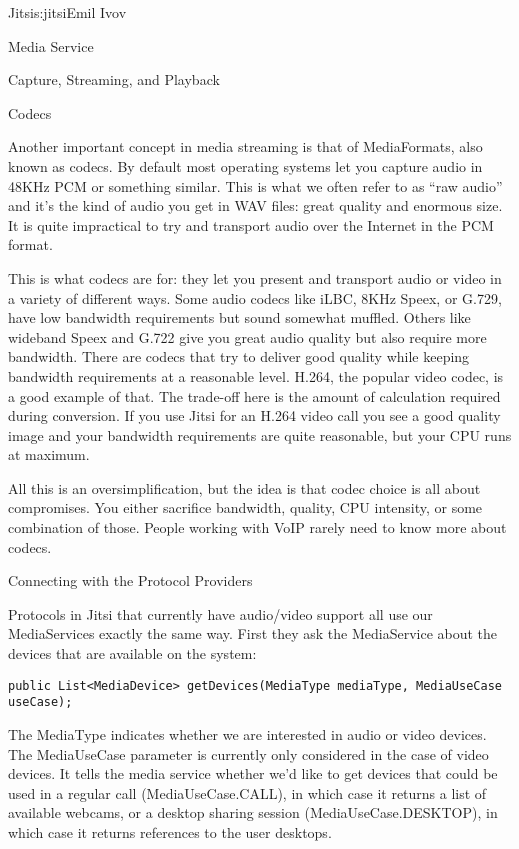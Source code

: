\begin{aosachapter}{Jitsi}{s:jitsi}{Emil Ivov}
\begin{aosasect1}{Media Service}
\begin{aosasect2}{Capture, Streaming, and Playback}
\end{aosasect2}

\begin{aosasect2}{Codecs}

Another important concept in media streaming is that of MediaFormats,
also known as codecs. By default most operating systems let you
capture audio in 48KHz PCM or something similar.  This is what we
often refer to as ``raw audio'' and it's the kind of audio you get in
WAV files: great quality and enormous size. It is quite impractical to
try and transport audio over the Internet in the PCM format.

This is what codecs are for: they let you present and transport audio
or video in a variety of different ways.  Some audio codecs like iLBC,
8KHz Speex, or G.729, have low bandwidth requirements but sound
somewhat muffled.  Others like wideband Speex and G.722 give you great
audio quality but also require more bandwidth. There are codecs that
try to deliver good quality while keeping bandwidth requirements at a
reasonable level.  H.264, the popular video codec, is a good example
of that. The trade-off here is the amount of calculation required
during conversion. If you use Jitsi for an H.264 video call you see a
good quality image and your bandwidth requirements are quite
reasonable, but your CPU runs at maximum.

All this is an oversimplification, but the idea is that codec choice
is all about compromises. You either sacrifice bandwidth, quality, CPU
intensity, or some combination of those. People working with VoIP
rarely need to know more about codecs.

\end{aosasect2}

\begin{aosasect2}{Connecting with the Protocol Providers}

Protocols in Jitsi that currently have audio/video support all use our
MediaServices exactly the same way. First they ask the MediaService
about the devices that are available on the system:

\begin{verbatim}
public List<MediaDevice> getDevices(MediaType mediaType, MediaUseCase useCase);
\end{verbatim}

\noindent The MediaType indicates whether we are interested in audio or video
devices. The MediaUseCase parameter is currently only considered in
the case of video devices. It tells the media service whether we'd
like to get devices that could be used in a regular call
(MediaUseCase.CALL), in which case it returns a list of available
webcams, or a desktop sharing session (MediaUseCase.DESKTOP), in which
case it returns references to the user desktops.


\end{aosasect2}
\end{aosasect1}
\end{aosachapter}
